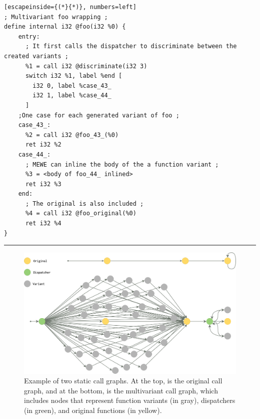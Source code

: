 \begin{minipage}[t]{0.9\linewidth}
\scriptsize
\centering
\noindent\begin{minipage}[b]{\linewidth}
    \begin{minipage}[t]{1\linewidth}
        \begin{lstlisting}[escapeinside={(*}{*)}, numbers=left]
; Multivariant foo wrapping ;
define internal i32 @foo(i32 %0) {
    entry:
      ; It first calls the dispatcher to discriminate between the created variants ;
      %1 = call i32 @discriminate(i32 3)
      switch i32 %1, label %end [
        i32 0, label %case_43_
        i32 1, label %case_44_
      ]
    ;One case for each generated variant of foo ;
    case_43_:                 
      %2 = call i32 @foo_43_(%0)
      ret i32 %2
    case_44_:
      ; MEWE can inline the body of the a function variant ;
      %3 = <body of foo_44_ inlined>
      ret i32 %3
    end:                                  
      ; The original is also included ;           
      %4 = call i32 @foo_original(%0)
      ret i32 %4
}
        \end{lstlisting}
    \end{minipage}%
    
    \noindent\rule{\linewidth}{0.4pt}
    \label{listing:multivariant_template}
\end{minipage}
\end{minipage}


\begin{figure}[h]
  \centering
\includegraphics[width=.75\linewidth]{diagrams/CFG.png}
\caption{Example of two static call graphs. At the top, is the original call graph, and at the bottom, is the multivariant call graph, which includes nodes that represent function variants (in gray), dispatchers (in green), and original functions  (in yellow).
}
\label{multivariant}
\end{figure}

